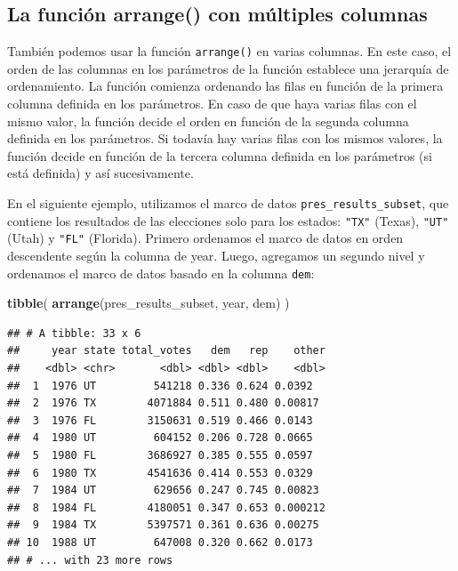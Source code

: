 \documentclass[
]{book}
\newenvironment{Shaded}{\begin{snugshade}}{\end{snugshade}}
\newcommand{\KeywordTok}[1]{\textcolor[rgb]{0.13,0.29,0.53}{\textbf{#1}}}
\newcommand{\NormalTok}[1]{#1}
\newcommand{\OperatorTok}[1]{\textcolor[rgb]{0.81,0.36,0.00}{\textbf{#1}}}
\newcommand{\StringTok}[1]{\textcolor[rgb]{0.31,0.60,0.02}{#1}}
\begin{document}
\hypertarget{la-funciuxf3n-arrange-con-muxfaltiples-columnas}{%
\subsection{La función arrange() con múltiples columnas}\label{la-funciuxf3n-arrange-con-muxfaltiples-columnas}}

También podemos usar la función \texttt{arrange()} en varias columnas. En este caso, el orden de las columnas en los parámetros de la función establece una jerarquía de ordenamiento. La función comienza ordenando las filas en función de la primera columna definida en los parámetros. En caso de que haya varias filas con el mismo valor, la función decide el orden en función de la segunda columna definida en los parámetros. Si todavía hay varias filas con los mismos valores, la función decide en función de la tercera columna definida en los parámetros (si está definida) y así sucesivamente.

En el siguiente ejemplo, utilizamos el marco de datos \texttt{pres\_results\_subset}, que contiene los resultados de las elecciones solo para los estados: \texttt{"TX"} (Texas), \texttt{"UT"} (Utah) y \texttt{"FL"} (Florida). Primero ordenamos el marco de datos en orden descendente según la columna de year. Luego, agregamos un segundo nivel y ordenamos el marco de datos basado en la columna \texttt{dem}:

\begin{Shaded}
\end{Shaded}

\begin{Shaded}
\begin{Highlighting}[]
\KeywordTok{tibble}\NormalTok{(}
\KeywordTok{arrange}\NormalTok{(pres_results_subset, year, dem)}
\NormalTok{)}
\end{Highlighting}
\end{Shaded}

\begin{verbatim}
## # A tibble: 33 x 6
##     year state total_votes   dem   rep    other
##    <dbl> <chr>       <dbl> <dbl> <dbl>    <dbl>
##  1  1976 UT         541218 0.336 0.624 0.0392  
##  2  1976 TX        4071884 0.511 0.480 0.00817 
##  3  1976 FL        3150631 0.519 0.466 0.0143  
##  4  1980 UT         604152 0.206 0.728 0.0665  
##  5  1980 FL        3686927 0.385 0.555 0.0597  
##  6  1980 TX        4541636 0.414 0.553 0.0329  
##  7  1984 UT         629656 0.247 0.745 0.00823 
##  8  1984 FL        4180051 0.347 0.653 0.000212
##  9  1984 TX        5397571 0.361 0.636 0.00275 
## 10  1988 UT         647008 0.320 0.662 0.0173  
## # ... with 23 more rows
\end{verbatim}
\end{document}
